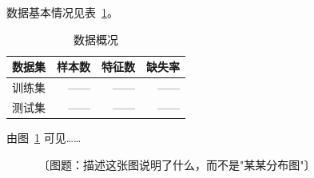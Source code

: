
数据基本情况见表~\ref{tab:data-overview}。

\begin{table}[H]
\centering
\caption{数据概况}
\label{tab:data-overview}
\begin{tabular}{lrrr}
\toprule
数据集 & 样本数 & 特征数 & 缺失率 \\
\midrule
训练集 & —— & —— & —— \\
测试集 & —— & —— & —— \\
\bottomrule
\end{tabular}
\end{table}

由图~\ref{fig:example} 可见……

\begin{figure}[H]
\centering
\caption{〔图题：描述这张图说明了什么，而不是"某某分布图"〕}
\label{fig:example}
\end{figure}

